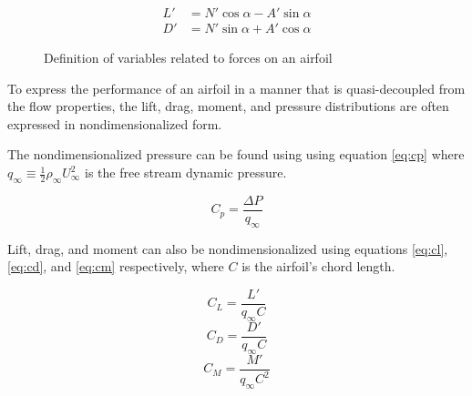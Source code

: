 \documentclass[runningheads]{llncs}
\begin{document}
\begin{align}
    L' &= N'\cos\alpha - A'\sin\alpha \label{eq:lift} \\
    D' &= N'\sin\alpha + A'\cos\alpha \label{eq:drag}
\end{align}

\begin{figure}
    \centering
    \caption{Definition of variables related to forces on an airfoil}
    \label{fig:airfoil_directions}
\end{figure}

\noindent
To express the performance of an airfoil in a manner that is quasi-decoupled from the flow properties, the lift, drag, moment, and pressure distributions are often expressed in nondimensionalized form.

\noindent
The nondimensionalized pressure can be found using using equation \ref{eq:cp} where $q_\infty\equiv\frac{1}{2}\rho_\infty U_\infty^2$ is the free stream dynamic pressure.\newline

\begin{equation}
    C_p = \frac{\Delta P}{q_\infty}
    \label{eq:cp}
\end{equation}

\noindent
Lift, drag, and moment can also be nondimensionalized using equations \ref{eq:cl}, \ref{eq:cd}, and \ref{eq:cm} respectively, where $C$ is the airfoil's chord length.\newline

\begin{multicols}{3}
\begin{equation}
    C_L = \frac{L'}{q_\infty C}
    \label{eq:cl}
\end{equation}
\begin{equation}
    C_D = \frac{D'}{q_\infty C}
    \label{eq:cd}
\end{equation}
\begin{equation}
    C_M = \frac{M'}{q_\infty C^2}
    \label{eq:cm}
\end{equation}
\end{multicols}
\end{document}
